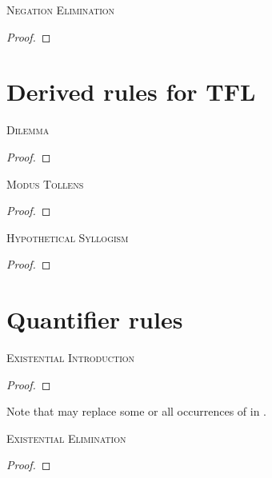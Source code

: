 \begin{multicols}{2}
\noindent\textsc{Negation Elimination}

\begin{proof}
	\open
		 
	\close
\end{proof}
\bigskip


\section{Derived rules for TFL}

\textsc{Dilemma}

\begin{proof}
	 
\end{proof}
\bigskip

\textsc{Modus Tollens}

\begin{proof}
	 
\end{proof}
\bigskip

\textsc{Hypothetical Syllogism}

\begin{proof}
\end{proof}

\end{multicols}

\newpage

\section{Quantifier rules}

\noindent\textsc{Existential Introduction}

\begin{proof}
	 
\end{proof}

Note that  may replace some or all occurrences of  in .
\bigskip


\noindent\textsc{Existential Elimination}

\begin{proof}
	\open	
	\close
	 
\end{proof}

